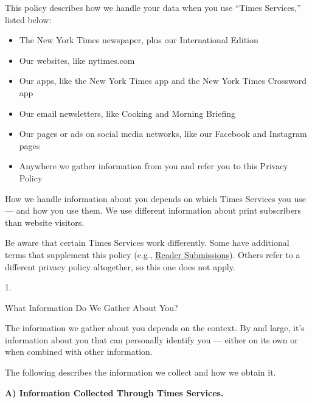 This policy describes how we handle your data when you use ``Times
Services,'' listed below:

\begin{itemize}
\tightlist
\item
  The New York Times newspaper, plus our International Edition
\item
  Our websites, like nytimes.com
\item
  Our apps, like the New York Times app and the New York Times Crossword
  app
\item
  Our email newsletters, like Cooking and Morning Briefing
\item
  Our pages or ads on social media networks, like our Facebook and
  Instagram pages
\item
  Anywhere we gather information from you and refer you to this Privacy
  Policy
\end{itemize}

How we handle information about you depends on which Times Services you
use --- and how you use them. We use different information about print
subscribers than website visitors.

Be aware that certain Times Services work differently. Some have
additional terms that supplement this policy (e.g.,
\href{https://help.nytimes.com/hc/en-us/articles/360004901454-Reader-submission-terms}{Reader
Submissions}). Others refer to a different privacy policy altogether, so
this one does not apply.

1.

What Information Do We Gather About You?

The information we gather about you depends on the context. By and
large, it's information about you that can personally identify you ---
either on its own or when combined with other information.

The following describes the information we collect and how we obtain it.

\textbf{A) Information Collected Through Times Services.}

